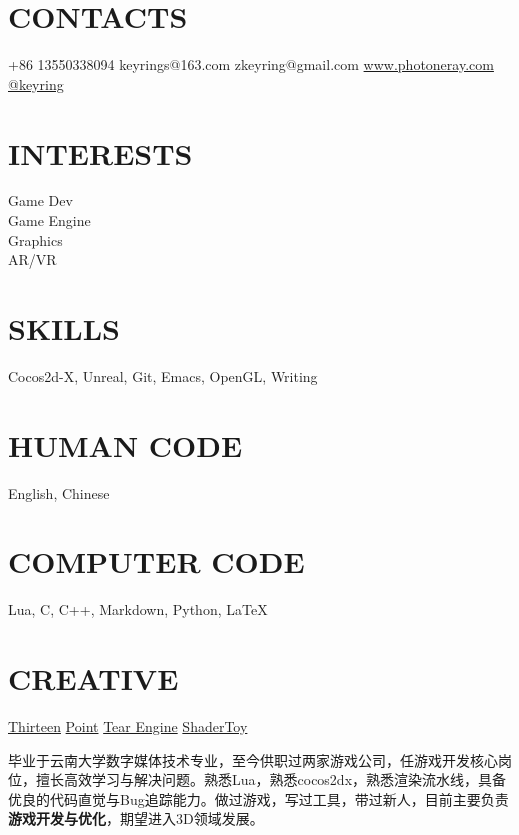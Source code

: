 \documentclass[full]{rvca}
\begin{document}


\begin{aside} %
\section{\uppercase{contacts}}
+86 13550338094 {\faMobile}
keyrings@163.com {\scriptsize\faLink}
zkeyring@gmail.com {\scriptsize\faLink}
\href{http://www.photoneray.com}{\color{sidebandtextcolor}www.photoneray.com \faGlobe} 
\href{https://github.com/keyring}{\color{sidebandtextcolor}@keyring \faGithub}
\ghost
\section{\uppercase{interests}}
Game Dev\\Game Engine\\Graphics\\AR/VR
\ghost
\section{\uppercase{skills}}
{\scriptsize\faHeart}Cocos2d-X, Unreal, Git, Emacs, OpenGL, Writing
\ghost 
\section{\uppercase{human code}}
English, Chinese
\ghost
\section{\uppercase{computer code}}
{\scriptsize\faHeart}Lua, {\scriptsize\faHeart}C, C++, {\scriptsize\faHeart}Markdown, Python, \LaTeX
\ghost
\section{\uppercase{creative}}
\href{http://a.app.qq.com/o/simple.jsp?pkgname=com.kode.Thirteen}{\color{sidebandtextcolor}Thirteen}
\href{https://github.com/keyring/point}{\color{sidebandtextcolor}Point}
\href{http://www.photoneray.com/Tear}{\color{sidebandtextcolor}Tear Engine}
\href{https://github.com/keyring/ShaderToy}{\color{sidebandtextcolor}ShaderToy}
\ghost
\end{aside}



\begin{statement}
毕业于云南大学数字媒体技术专业，至今供职过两家游戏公司，任游戏开发核心岗位，擅长高效学习与解决问题。熟悉Lua，熟悉cocos2dx，熟悉渲染流水线，具备优良的代码直觉与Bug追踪能力。做过游戏，写过工具，带过新人，目前主要负责\textbf{游戏开发与优化}，期望进入3D领域发展。
\end{statement}
\end{document}
